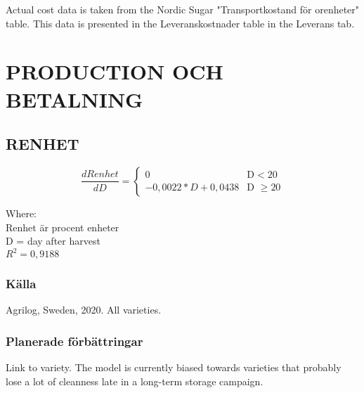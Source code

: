 \documentclass[fleqn]{article}
\begin{document}
  \medskip
  Actual cost data is taken from the Nordic Sugar "Transportkostand för orenheter" table. This data is presented in the Leveranskostnader table in the Leverans tab.


\pagebreak
\section{PRODUCTION OCH BETALNING}

  \subsection{RENHET}

  \begin{equation}
    \frac{dRenhet}{dD} =
    \begin{cases}
      0 & \text{D} < 20\\
      -0,0022*D + 0,0438 & \text{D $\geq 20$}
    \end{cases}
  \end{equation}

  Where:\\
  \hangindent=1.5cm
  Renhet är procent enheter\\
  D = day after harvest\\
  $R^2 = 0,9188$

    \subsubsection{Källa}
    Agrilog, Sweden, 2020. All varieties.
    
    \subsubsection{Planerade förbättringar}
    Link to variety. The model is currently biased towards varieties that probably lose a lot of cleanness late in a long-term storage campaign.

\end{document}

